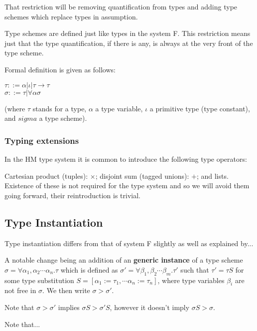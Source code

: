 That restriction will be removing quantification from types and adding type schemes which replace types in assumption.

Type schemes are defined just like types in the system F. This restriction means just that the type quantification, if there is any, is always at the very front of the type scheme.

Formal definition is given as follows:

$\tau ::= \alpha | \iota | \tau \rightarrow \tau$ \\
$\sigma ::= \tau | \forall \alpha \sigma$

(where $\tau$ stands for a type, $\alpha$ a type variable, $\iota$ a primitive type (type constant), and $sigma$ a type scheme). %

\subsubsection{Typing extensions}

In the HM type system it is common to introduce the following type operators:

Cartesian product (tuples): $\times$; disjoint sum (tagged unions): $+$; and lists. Existence of these is not required for the type system and so we will avoid them going forward, their reintroduction is trivial.

\subsection{Type Instantiation}

Type instantiation differs from that of system F slightly as well as explained  by... %

A notable change being an addition of an \textbf{generic instance} of a type scheme $\sigma = \forall \alpha_1, \alpha_2 \cdots \alpha_n . \tau$ which is defined as $\sigma' = \forall \beta_1, \beta_2 \cdots \beta_m . \tau'$ such that
$\tau' = \tau S$ for some type substitution $S = [\alpha_1 := \tau_1, \cdots \alpha_n := \tau_n]$, where type variables $\beta_i$ are not free in $\sigma$. We then write $\sigma > \sigma'$.

Note that $\sigma > \sigma'$ implies $\sigma S > \sigma' S$, however it doesn't imply $\sigma S > \sigma$.

Note that... %

